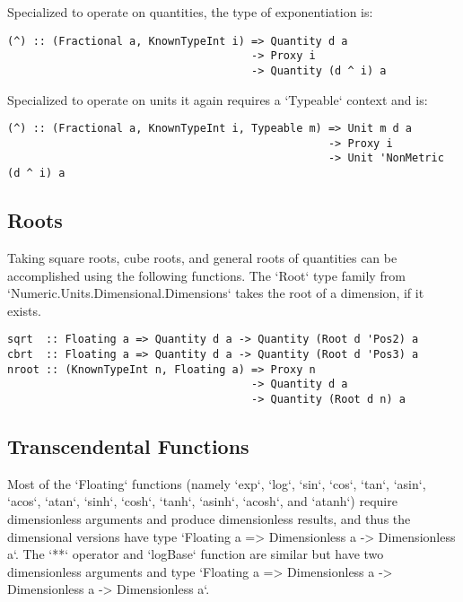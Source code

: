 \documentclass[11pt]{report}
\begin{document}
Specialized to operate on quantities, the type of exponentiation is:

\begin{lstlisting}
(^) :: (Fractional a, KnownTypeInt i) => Quantity d a
                                      -> Proxy i
                                      -> Quantity (d ^ i) a
\end{lstlisting}

Specialized to operate on units it again requires a `Typeable` context and is:

\begin{lstlisting}
(^) :: (Fractional a, KnownTypeInt i, Typeable m) => Unit m d a
                                                  -> Proxy i
                                                  -> Unit 'NonMetric (d ^ i) a
\end{lstlisting}

\subsection{Roots}

Taking square roots, cube roots, and general roots of quantities can be accomplished using the following functions.
The `Root` type family from `Numeric.Units.Dimensional.Dimensions` takes the root of a dimension, if it exists.

\begin{lstlisting}
sqrt  :: Floating a => Quantity d a -> Quantity (Root d 'Pos2) a
cbrt  :: Floating a => Quantity d a -> Quantity (Root d 'Pos3) a
nroot :: (KnownTypeInt n, Floating a) => Proxy n
                                      -> Quantity d a
                                      -> Quantity (Root d n) a
\end{lstlisting}

\subsection{Transcendental Functions}

Most of the `Floating` functions (namely `exp`, `log`, `sin`, `cos`, `tan`, `asin`, `acos`, `atan`, `sinh`, `cosh`, `tanh`, `asinh`, `acosh`, and `atanh`)
require dimensionless arguments and produce dimensionless results, and thus the dimensional versions have type `Floating a => Dimensionless a -> Dimensionless a`.
The `**` operator and `logBase` function are similar but have two dimensionless arguments and type `Floating a => Dimensionless a -> Dimensionless a -> Dimensionless a`.
\end{document}
